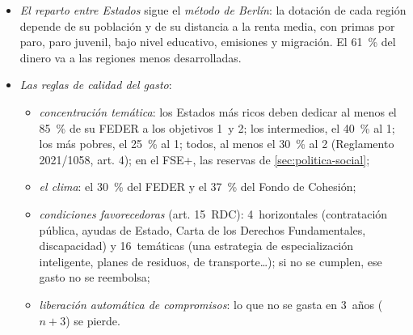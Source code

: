 \documentclass[11pt]{article}
\begin{document}
\begin{itemize}
  \begin{itemize}
  \item \emph{menos desarrolladas} (menos del 75~\%): hasta el 85~\% del gasto. En España, Andalucía, Castilla-La Mancha, Extremadura, Ceuta y Melilla;
  \item \emph{en transición} (75-100~\%; la categoría pasó del 90~\% al 100~\% en 2021): hasta el 60~\% (70~\% si antes eran menos desarrolladas)\nocite{UE2021Categorias}. En España, 9: Galicia, Asturias, Cantabria, La Rioja, Castilla y León, la Comunidad Valenciana, Baleares, Murcia y Canarias;
  \item \emph{más desarrolladas} (más del 100~\%): hasta el 40~\% (50~\% si antes estaban por debajo). En España, el País Vasco, Navarra, Aragón, Madrid y Cataluña\nocite{UE2021Categorias}.
  \end{itemize}
\item \emph{El reparto entre Estados} sigue el \emph{método de Berlín}: la dotación de cada región depende de su población y de su distancia a la renta media, con primas por paro, paro juvenil, bajo nivel educativo, emisiones y migración. El 61~\% del dinero va a las regiones menos desarrolladas\nocite{UE2021RDC}.
\item \emph{Las reglas de calidad del gasto}:
  \begin{itemize}
  \item \emph{concentración temática}: los Estados más ricos deben dedicar al menos el 85~\% de su FEDER a los objetivos 1~y 2; los intermedios, el 40~\% al 1; los más pobres, el 25~\% al 1; todos, al menos el 30~\% al 2 (Reglamento 2021/1058, art. 4)\nocite{UE2021RDC}; en el FSE+, las reservas de \ref{sec:politica-social};
  \item \emph{el clima}: el 30~\% del FEDER y el 37~\% del Fondo de Cohesión;
  \item \emph{condiciones favorecedoras} (art. 15~RDC): 4~horizontales (contratación pública, ayudas de Estado, Carta de los Derechos Fundamentales, discapacidad) y 16~temáticas (una estrategia de especialización inteligente, planes de residuos, de transporte\ldots); si no se cumplen, ese gasto no se reembolsa;
  \item \emph{liberación automática de compromisos}: lo que no se gasta en 3~años ($n+3$) se pierde.
  \end{itemize}
\end{itemize}

\begin{infografia}[H]
\centering
\caption{La arquitectura de la política de cohesión 2021-2027}\label{figu:marco}
\end{infografia}
\end{document}
